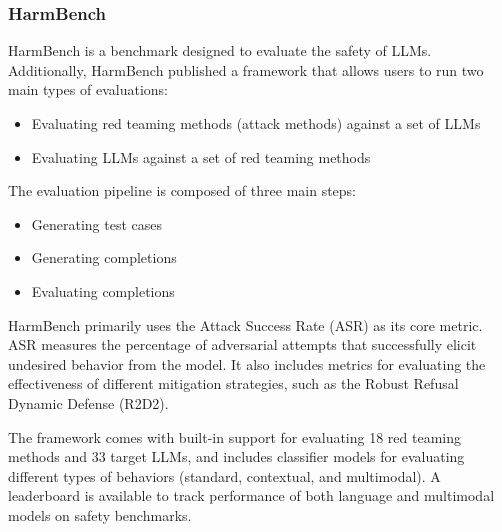 \subsubsection{HarmBench}

HarmBench  is a benchmark designed to evaluate the safety of LLMs. Additionally, HarmBench published a framework  that allows users to run two main types of evaluations:
\begin{itemize}
\item Evaluating red teaming methods (attack methods) against a set of LLMs
\item Evaluating LLMs against a set of red teaming methods
\end{itemize}

The evaluation pipeline is composed of three main steps:
\begin{itemize}
\item Generating test cases
\item Generating completions
\item Evaluating completions
\end{itemize}

HarmBench primarily uses the Attack Success Rate (ASR) as its core metric. ASR measures the percentage of adversarial attempts that successfully elicit undesired behavior from the model. It also includes metrics for evaluating the effectiveness of different mitigation strategies, such as the Robust Refusal Dynamic Defense (R2D2).

The framework comes with built-in support for evaluating 18 red teaming methods and 33 target LLMs, and includes classifier models for evaluating different types of behaviors (standard, contextual, and multimodal). A leaderboard is available  to track performance of both language and multimodal models on safety benchmarks.

